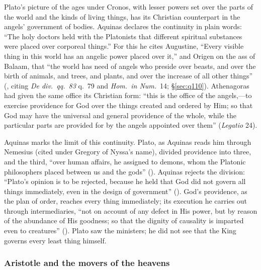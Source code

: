 Plato's picture of the ages under Cronos, with lesser powers set over
the parts of the world and the kinds of living things, has its
Christian counterpart in the angels' government of bodies. Aquinas
declares the continuity in plain words: ``The holy doctors held with the
Platonists that different spiritual substances were placed over
corporeal things.'' For this he cites Augustine, ``Every visible thing
in this world has an angelic power placed over it,'' and Origen on the
ass of Balaam, that ``the world has need of angels who preside over
beasts, and over the birth of animals, and trees, and plants, and over
the increase of all other things'' (, citing
\emph{De div.\ qq.~83} q.~79 and \emph{Hom.\ in Num.}\ 14;
\S\ref{sec:q110}).
Athenagoras had given the same office its Christian form: ``this is the
office of the angels,---to exercise providence for God over the things
created and ordered by Him; so that God may have the universal and
general providence of the whole, while the particular parts are provided
for by the angels appointed over them'' (\emph{Legatio} 24).

Aquinas marks the limit of this continuity. Plato, as Aquinas reads
him through Nemesius (cited under Gregory of Nyssa's name), divided
providence into three, and the third, ``over human affairs, he assigned
to demons, whom the Platonic philosophers placed between us and the
gods'' (). Aquinas rejects the division: ``Plato's
opinion is to be rejected, because he held that God did not govern all
things immediately, even in the design of government'' (). God's providence, as the plan of order, reaches every
thing immediately; its execution he carries out through intermediaries,
``not on account of any defect in His power, but by reason of the
abundance of His goodness; so that the dignity of causality is imparted
even to creatures'' (). Plato saw the ministers; he did
not see that the King governs every least thing himself.

\subsubsection{Aristotle and the movers of the heavens}\label{sec:bc-aristotle}

